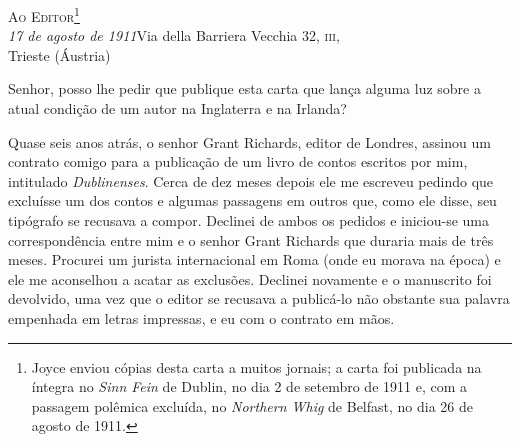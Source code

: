 {\raggedright\large
\textsc{Ao Editor}\footnote{ Joyce enviou cópias desta carta a muitos jornais; a carta foi
publicada na íntegra no \textit{Sinn Fein} de Dublin, no dia 2 de setembro de
1911 e, com a passagem polêmica excluída, no \textit{Northern Whig} de Belfast,
no dia 26 de agosto de 1911.}\\\smallskip\normalsize
\textit{17 de agosto de 1911}\hfill Via della Barriera Vecchia 32, \textsc{iii},\\\raggedleft Trieste (Áustria)
\par}

\bigskip

Senhor, posso lhe pedir que publique esta carta que lança alguma luz sobre a
atual condição de um autor na Inglaterra e na Irlanda?

Quase seis anos atrás, o senhor Grant Richards, editor de Londres, assinou um
contrato comigo para a publicação de um livro de contos escritos por mim,
intitulado \textit{Dublinenses}. Cerca de dez meses depois ele me escreveu
pedindo que excluísse um dos contos e algumas passagens em outros que, como ele
disse, seu tipógrafo se recusava a compor. Declinei de ambos os pedidos e
iniciou-se uma correspondência entre mim e o senhor Grant Richards que duraria
mais de três meses. Procurei um jurista internacional em Roma (onde eu morava na
época) e ele me aconselhou a acatar as exclusões. Declinei novamente e o
manuscrito foi devolvido, uma vez que o editor se recusava a publicá-lo não
obstante sua palavra empenhada em letras impressas, e eu com o contrato em mãos.

